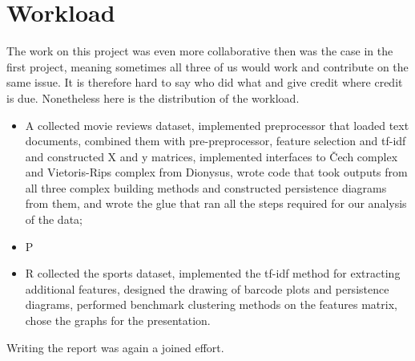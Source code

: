\section{Workload} 
\label{sec:workload}

The work on this project was even more collaborative then was the case in the
first project, meaning sometimes all three of us would work and contribute on
the same issue. It is therefore hard to say who did what and give credit where
credit is due. Nonetheless here is the distribution of the workload.

\begin{itemize}
  \item A collected movie reviews dataset, implemented preprocessor that loaded
    text documents, combined them with pre-preprocessor, feature selection and
    tf-idf and constructed X and y matrices, implemented interfaces to Čech
    complex and Vietoris-Rips complex from Dionysus, wrote code that took
    outputs from all three complex building methods and constructed persistence
    diagrams from them, and wrote the glue that ran all the steps required for
    our analysis of the data;
  \item P
  \item R collected the sports dataset, implemented the tf-idf method for
    extracting additional features, designed the drawing of barcode plots and
    persistence diagrams, performed benchmark clustering methods on the
    features matrix, chose the graphs for the presentation.
\end{itemize}

Writing the report was again a joined effort.
